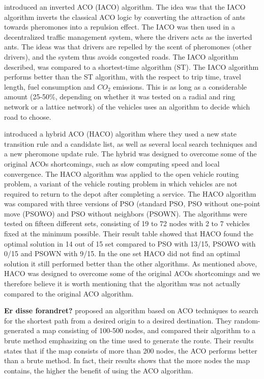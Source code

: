 \citet{dias14} introduced an inverted ACO (IACO) algorithm. The idea was that the IACO algorithm inverts the classical ACO logic by converting the attraction of ants towards pheromones into a repulsion effect. The IACO was then used in a decentralized traffic management system, where the drivers acts as the inverted ants. The ideas was that drivers are repelled by the scent of pheromones (other drivers), and the system thus avoids congested roads. The IACO algorithm described, was compared to a shortest-time algorithm (ST). The IACO algorithm performs better than the ST algorithm, with the respect to trip time, travel length, fuel consumption and $CO_2$ emissions. This is as long as a considerable amount (25-50\%, depending on whether it was tested on a radial and ring network or a lattice network) of the vehicles uses an algorithm to decide which road to choose. 

\citet{sedighpour14} introduced a hybrid ACO (HACO) algorithm where they used a new state transition rule and a candidate list, as well as several local search techniques and a new pheromone update rule. The hybrid was designed to overcome some of the original ACOs shortcomings, such as slow computing speed and local convergence. The HACO algorithm was applied to the open vehicle routing problem, a variant of the vehicle routing problem in which vehicles are not required to return to the depot after completing a service. The HACO algorithm was compared with three versions of PSO (standard PSO, PSO without one-point move (PSOWO) and PSO without neighbors (PSOWN). The algorithms were tested on fifteen different sets, consisting of 19 to 72 nodes with 2 to 7 vehicles fixed at the minimum possible. Their result table showed that HACO found the optimal solution in 14 out of 15 set compared to PSO with 13/15, PSOWO with 0/15 and PSOWN with 9/15. In the one set HACO did not find an optimal solution it still performed better than the other algorithms. As mentioned above, HACO was designed to overcome some of the original ACOs shortcomings and we therefore believe it is worth mentioning that the algorithm was not actually compared to the original ACO algorithm. 

\textbf{Er disse forandret?}\newline
\citet{hsiao04} proposed an algorithm based on ACO techniques to search for the shortest path from a desired origin to a desired destination. They random-generated a map consisting of 100-500 nodes, and compared their algorithm to a brute method emphasizing on the time used to generate the route. Their results states that if the map consists of more than 200 nodes, the ACO performs better than a brute method. In fact, their results shows that the more nodes the map contains, the higher the benefit of using the ACO algorithm. 

